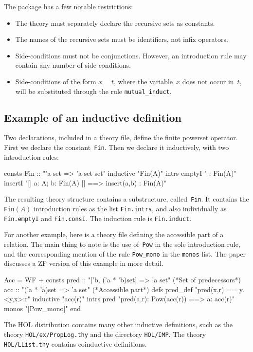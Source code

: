 The package has a few notable restrictions:
\begin{itemize}
\item The theory must separately declare the recursive sets as
  constants.

\item The names of the recursive sets must be identifiers, not infix
operators.  

\item Side-conditions must not be conjunctions.  However, an introduction rule
may contain any number of side-conditions.

\item Side-conditions of the form $x=t$, where the variable~$x$ does not
  occur in~$t$, will be substituted through the rule \verb|mutual_induct|.
\end{itemize}


\subsection{Example of an inductive definition}
Two declarations, included in a theory file, define the finite powerset
operator.  First we declare the constant~{\tt Fin}.  Then we declare it
inductively, with two introduction rules:
\begin{ttbox}
consts Fin :: "'a set => 'a set set"
inductive "Fin(A)"
  intrs
    emptyI  "{} : Fin(A)"
    insertI "[| a: A;  b: Fin(A) |] ==> insert(a,b) : Fin(A)"
\end{ttbox}
The resulting theory structure contains a substructure, called~{\tt Fin}.
It contains the {\tt Fin}$(A)$ introduction rules as the list {\tt Fin.intrs},
and also individually as {\tt Fin.emptyI} and {\tt Fin.consI}.  The induction
rule is {\tt Fin.induct}.

For another example, here is a theory file defining the accessible part of a
relation.  The main thing to note is the use of~{\tt Pow} in the sole
introduction rule, and the corresponding mention of the rule
\verb|Pow_mono| in the {\tt monos} list.  The paper discusses a ZF version
of this example in more detail.
\begin{ttbox}
Acc = WF + 
consts pred :: "['b, ('a * 'b)set] => 'a set"   (*Set of predecessors*)
       acc  :: "('a * 'a)set => 'a set"         (*Accessible part*)
defs   pred_def  "pred(x,r) == {y. <y,x>:r}"
inductive "acc(r)"
  intrs
     pred "pred(a,r): Pow(acc(r)) ==> a: acc(r)"
  monos   "[Pow_mono]"
end
\end{ttbox}
The HOL distribution contains many other inductive definitions, such as the
theory {\tt HOL/ex/PropLog.thy} and the directory {\tt HOL/IMP}.  The
theory {\tt HOL/LList.thy} contains coinductive definitions.

